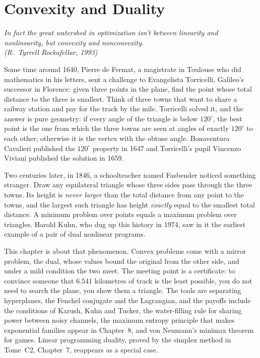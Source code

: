 \chapter{Convexity and Duality}\label{ch:convexity}

\begin{center}\itshape
In fact the great watershed in optimization isn't between linearity and nonlinearity, but convexity and nonconvexity.\\
\upshape(R.~Tyrrell Rockafellar, 1993)
\end{center}

Some time around 1640, Pierre de Fermat, a magistrate in Toulouse who did mathematics in his letters, sent a challenge to Evangelista Torricelli,
Galileo's successor in Florence: given three points in the plane, find the point whose total distance to the three is smallest. Think of three towns
that want to share a railway station and pay for the track by the mile. Torricelli solved it, and the answer is pure geometry: if every angle of the
triangle is below $120^\circ$, the best point is the one from which the three towns are seen at angles of exactly $120^\circ$ to each other; otherwise it is the
vertex with the obtuse angle. Bonaventura Cavalieri published the $120^\circ$ property in 1647 and Torricelli's pupil Vincenzo Viviani published the
solution in 1659.

Two centuries later, in 1846, a schoolteacher named Fasbender noticed something stranger. Draw any equilateral triangle whose three sides pass through
the three towns. Its height is \emph{never larger} than the total distance from any point to the towns, and the largest such triangle has height
\emph{exactly} equal to the smallest total distance. A minimum problem over points equals a maximum problem over triangles. Harold Kuhn, who dug up
this history in 1974, saw in it the earliest example of a pair of dual nonlinear programs.

This chapter is about that phenomenon. Convex problems come with a mirror problem, the dual, whose values bound the original from the other side,
and under a mild condition the two meet. The meeting point is a certificate: to convince someone that $6.541$ kilometres of track is the least possible,
you do not need to search the plane, you show them a triangle. The tools are separating hyperplanes, the Fenchel conjugate and the Lagrangian, and
the payoffs include the conditions of Karush, Kuhn and Tucker, the water-filling rule for sharing power between noisy channels, the maximum entropy
principle that makes exponential families appear in Chapter~8, and von Neumann's minimax theorem for games. Linear programming duality, proved by
the simplex method in Tome~C2, Chapter~7, reappears as a special case.

